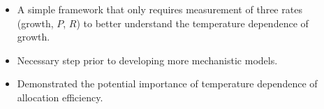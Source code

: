 \documentclass{beamer}
\begin{document}
\begin{frame}
  \begin{columns}
    \begin{column}{0.65\textwidth}
      \begin{itemize}
        \item A simple framework that only requires measurement of three rates
          (growth, $P$, $R$) to better understand the temperature dependence of
          growth. 
        \item Necessary step prior to developing more mechanistic models.
        \item Demonstrated the potential importance of temperature dependence of
          allocation efficiency.
      \end{itemize}
    \end{column}
    \begin{column}{0.4\textwidth}
    \end{column}
  \end{columns}

\end{frame}
\end{document}
